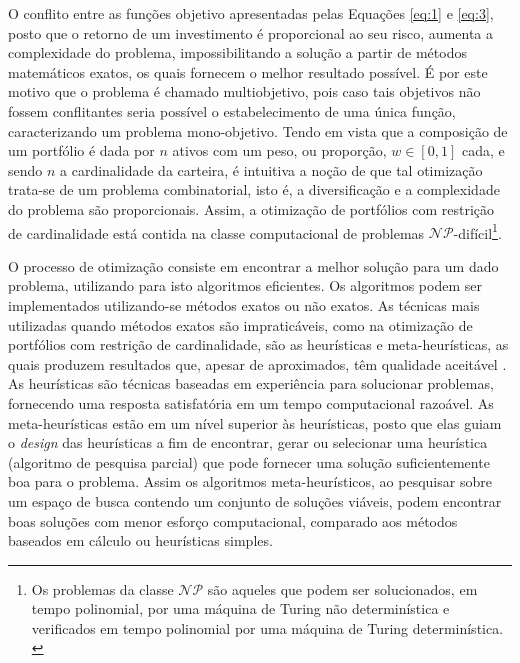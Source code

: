 \documentclass[11pt]{article}
\begin{document}
    
    
    
    
    O conflito entre as funções objetivo apresentadas pelas Equações \ref{eq:1} e \ref{eq:3}, posto que o retorno de um investimento é proporcional ao seu risco, aumenta a complexidade do problema, impossibilitando a solução a partir de métodos matemáticos exatos, os quais fornecem o melhor resultado possível. É por este motivo que o problema é chamado multiobjetivo, pois caso tais objetivos não fossem conflitantes seria possível o estabelecimento de uma única função, caracterizando um problema mono-objetivo. Tendo em vista que a composição de um portfólio é dada por $n$ ativos com um peso, ou proporção, $w \in [0, 1]$ cada, e sendo $n$ a cardinalidade da carteira, é intuitiva a noção de que tal otimização trata-se de um problema combinatorial, isto é, a diversificação e a complexidade do problema são proporcionais. Assim, a otimização de portfólios com restrição de cardinalidade está contida na classe computacional de problemas $\mathcal{NP}$-difícil\footnote{Os problemas da classe $\mathcal{NP}$ são aqueles que podem ser solucionados, em tempo polinomial, por uma máquina de Turing não determinística e verificados em tempo polinomial por uma máquina de Turing determinística. \cite{danielsson2001}}. \cite{danielsson2001}
    
    
    O processo de otimização consiste em encontrar a melhor solução para um dado problema, utilizando para isto algoritmos eficientes. Os algoritmos podem ser implementados utilizando-se métodos exatos ou não exatos. As técnicas mais utilizadas quando métodos exatos são impraticáveis, como na otimização de portfólios com restrição de cardinalidade, são as heurísticas e meta-heurísticas, as quais produzem resultados que, apesar de aproximados, têm qualidade aceitável \cite{goldbarg}. As heurísticas são técnicas baseadas em experiência para solucionar problemas, fornecendo uma resposta satisfatória em um tempo computacional razoável. As meta-heurísticas estão em um nível superior às heurísticas, posto que elas guiam o \textit{design} das heurísticas a fim de encontrar, gerar ou selecionar uma heurística (algoritmo de pesquisa parcial) que pode fornecer uma solução suficientemente boa para o problema. Assim os algoritmos meta-heurísticos, ao pesquisar sobre um espaço de busca contendo um conjunto de soluções viáveis, podem encontrar boas soluções com menor esforço computacional, comparado aos métodos baseados em cálculo ou heurísticas simples. \cite{metaheuristic}
    
\end{document}
